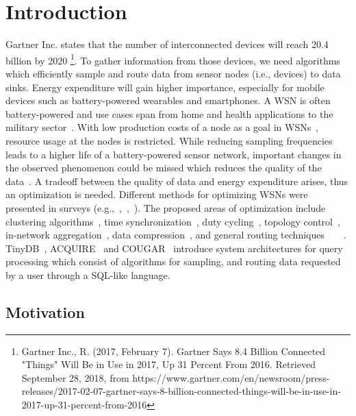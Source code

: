 \section{Introduction}
\label{sec:Introduction}
Gartner Inc. states that the number of interconnected devices will reach 20.4 billion by 2020 \footnote{Gartner Inc., R. (2017, February 7). Gartner Says 8.4 Billion Connected "Things" Will Be in Use in 2017, Up 31 Percent From 2016. Retrieved September 28, 2018, from https://www.gartner.com/en/newsroom/press-releases/2017-02-07-gartner-says-8-billion-connected-things-will-be-in-use-in-2017-up-31-percent-from-2016}.
To gather information from those devices, we need algorithms which efficiently sample and route data from sensor nodes (i.e., devices) to data sinks. Energy expenditure will gain higher importance, especially for mobile devices such as battery-powered wearables and smartphones. A \ac{WSN} is often battery-powered and use cases span from home and health applications to the military sector~\cite{akyildiz2002wireless}. With low production costs of a node as a goal in \acp{WSN}~\cite{akyildiz2002wireless}, resource usage at the nodes is restricted. While reducing sampling frequencies leads to a higher life of a battery-powered sensor network, important changes in the observed phenomenon could be missed which reduces the quality of the data~\cite{akyildiz2002wireless}. A tradeoff between the quality of data and energy expenditure arises, thus an optimization is needed. Different methods for optimizing \acp{WSN} were presented in surveys (e.g.,~\cite{abbasi2007survey},~\cite{sivrikaya2004time},~\cite{carrano2014survey}). The proposed areas of optimization include clustering algorithms~\cite{abbasi2007survey}, time synchronization~\cite{sivrikaya2004time}, duty cycling~\cite{carrano2014survey}, topology control~\cite{li2013survey}, in-network aggregation~\cite{fasolo2007network}, data compression~\cite{srisooksai2012practical}, and general routing techniques~\cite{al2004routing}~\cite{kulkarni2011particle}~\cite{singh2015survey}~\cite{rault2014energy}. TinyDB~\cite{madden2005tinydb}, ACQUIRE~\cite{sadagopan2003acquire} and COUGAR~\cite{yao2002cougar} introduce system architectures for query processing which consist of algorithms for sampling, and routing data requested by a user through a SQL-like language.


\subsection{Motivation}
\label{sec:motivation}

